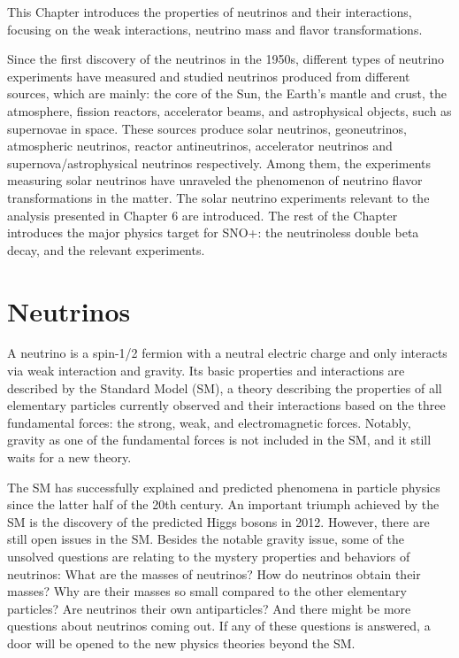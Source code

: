 This Chapter introduces the properties of neutrinos and their interactions, focusing on the weak interactions, neutrino mass and flavor transformations. 

Since the first discovery of the neutrinos in the 1950s, different types of neutrino experiments have measured and studied neutrinos produced from different sources, which are mainly: the core of the Sun, the Earth's mantle and crust, the atmosphere, fission reactors, accelerator beams, and astrophysical objects, such as supernovae in space. These sources produce solar neutrinos, geoneutrinos, atmospheric neutrinos, reactor antineutrinos, accelerator neutrinos and supernova/astrophysical neutrinos respectively. Among them, the experiments measuring solar neutrinos have unraveled the phenomenon of neutrino flavor transformations in the matter. The solar neutrino experiments relevant to the analysis presented in Chapter 6 are introduced. The rest of the Chapter introduces the major physics target for SNO+: the neutrinoless double beta decay, and the relevant experiments.

\section{Neutrinos}

A neutrino is a spin-1/2 fermion with a neutral electric charge and only interacts via weak interaction and gravity. Its basic properties and interactions are described by the Standard Model (SM), a theory describing the properties of all elementary particles currently observed and their interactions based on the three fundamental forces: the strong, weak, and electromagnetic forces. Notably, gravity as one of the fundamental forces is not included in the SM, and it still waits for a new theory. 

The SM has successfully explained and predicted phenomena in particle physics since the latter half of the 20th century. An important triumph achieved by the SM is the discovery of the predicted Higgs bosons in 2012. However, there are still open issues in the SM. Besides the notable gravity issue, some of the unsolved questions are relating to the mystery properties and behaviors of neutrinos: What are the masses of neutrinos? How do neutrinos obtain their masses? Why are their masses so small compared to the other elementary particles? Are neutrinos their own antiparticles? And there might be more questions about neutrinos coming out. If any of these questions is answered, a door will be opened to the new physics theories beyond the SM.

